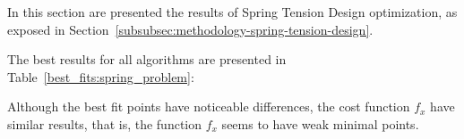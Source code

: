 In this section are presented the results of Spring Tension Design optimization,
as exposed in Section~\ref{subsubsec:methodology-spring-tension-design}.

The best results for all algorithms are presented in Table~\ref{best_fits:spring_problem}:

\begin{table}[H]
\centering
\caption{Best Fits for Spring Tension Design}
\label{best_fits:spring_problem}
\end{table}

Although the best fit points have noticeable differences, the cost function $f_x$ have similar results, that is, the
function $f_x$ seems to have weak minimal points.


